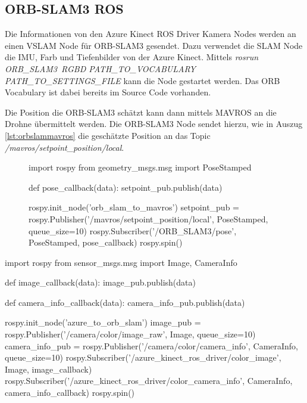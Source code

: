 \subsection{ORB-SLAM3 ROS}

Die Informationen von den Azure Kinect ROS Driver Kamera Nodes werden an einen \ac{VSLAM} Node für ORB-SLAM3 gesendet. Dazu verwendet die SLAM Node die \ac{IMU}, Farb und Tiefenbilder von der Azure Kinect.
Mittels \textit{rosrun ORB\_SLAM3\ RGBD PATH\_TO\_VOCABULARY PATH\_TO\_SETTINGS\_FILE} kann die Node gestartet werden.
Das ORB Vocabulary ist dabei bereits im Source Code vorhanden.
\cite[vgl.]{ORBSLAM3TRO}

Die Position die ORB-SLAM3 schätzt kann dann mittels MAVROS an die Drohne übermittelt werden.
Die ORB-SLAM3 Node sendet hierzu, wie in Auszug \ref{lst:orbslammavros} die geschätzte Position an das Topic \textit{/mavros/setpoint\_position/local}.

\begin{figure}
\begin{python}[breaklines=true, label=lst:orbslammavros,caption={ORB-SLAM3 Publisher zu MAVROS}]
import rospy
from geometry_msgs.msg import PoseStamped

def pose_callback(data):
    setpoint_pub.publish(data)

rospy.init_node('orb_slam_to_mavros')
setpoint_pub = rospy.Publisher('/mavros/setpoint_position/local', PoseStamped, queue_size=10)
rospy.Subscriber('/ORB_SLAM3/pose', PoseStamped, pose_callback)
rospy.spin()
\end{python}
\end{figure}



\begin{python}[breaklines=true,label=lst:azurepublish, caption={Azure Kamera Publisher zu ORB-SLAM3}]
    
import rospy
from sensor_msgs.msg import Image, CameraInfo

def image_callback(data):
    image_pub.publish(data)

def camera_info_callback(data):
    camera_info_pub.publish(data)

rospy.init_node('azure_to_orb_slam')
image_pub = rospy.Publisher('/camera/color/image_raw', Image, queue_size=10)
camera_info_pub = rospy.Publisher('/camera/color/camera_info', CameraInfo, queue_size=10)
rospy.Subscriber('/azure_kinect_ros_driver/color_image', Image, image_callback)
rospy.Subscriber('/azure_kinect_ros_driver/color_camera_info', CameraInfo, camera_info_callback)
rospy.spin()

\end{python}

